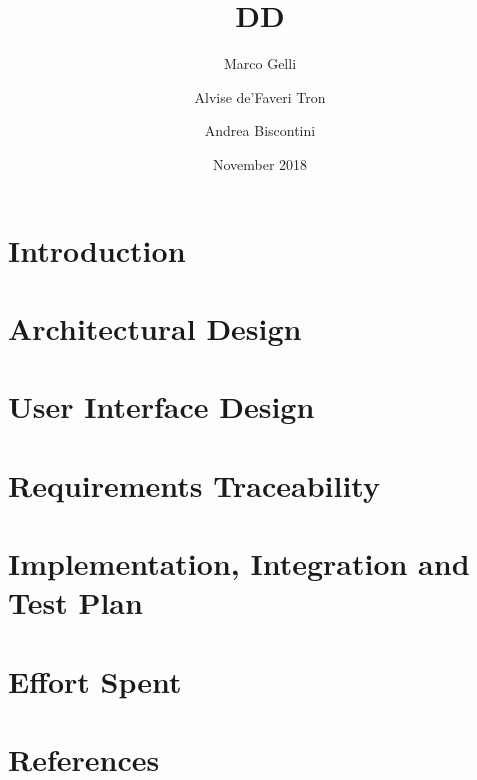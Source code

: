 \documentclass[12pt]{article}
\title{DD}
\author{Marco Gelli \and Alvise de'Faveri Tron \and Andrea Biscontini}
\date{November 2018}
\begin{document}
\maketitle

\newpage

\tableofcontents

\section{Introduction}


\newpage

\section{Architectural Design}


\newpage

\section{User Interface Design}


\newpage

\section{Requirements Traceability}


\newpage

\section{Implementation, Integration and Test Plan}


\newpage

\section{Effort Spent}


\newpage

\section{References}

\end{document}
